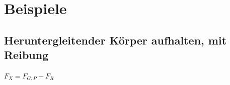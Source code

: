 \documentclass[11pt,twoside,a4paper]{article}
\begin{document}
	\section{Beispiele}
	
	\subsection{Heruntergleitender Körper aufhalten, mit Reibung}
	
	\(F_X = F_{G,P} - F_R \)
	
\end{document}
